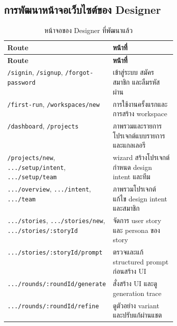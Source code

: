 
\subsection{การพัฒนาหน้าจอเว็บไซต์ของ Designer}
\begingroup
\small
\begin{xltabular}{\linewidth}{|>{\RaggedRight\arraybackslash}p{0.40\linewidth}|>{\RaggedRight\arraybackslash}X|}
  \caption{หน้าจอของ Designer ที่พัฒนาแล้ว}\label{tab:designer-screens}\\
  \hline
  \textbf{Route} & \textbf{หน้าที่} \\ \hline
  \endfirsthead
  \hline
  \textbf{Route} & \textbf{หน้าที่} \\ \hline
  \endhead
  \texttt{/signin}, \texttt{/signup}, \texttt{/forgot-password} & เข้าสู่ระบบ สมัครสมาชิก และลืมรหัสผ่าน \\ \hline
  \texttt{/first-run}, \texttt{/workspaces/new} & การใช้งานครั้งแรกและการสร้าง workspace \\ \hline
  \texttt{/dashboard}, \texttt{/projects} & ภาพรวมและรายการโปรเจกต์แบบรายการและแกลเลอรี \\ \hline
  \texttt{/projects/new}, \texttt{.../setup/intent}, \texttt{.../setup/team} & wizard สร้างโปรเจกต์ กำหนด design intent และทีม \\ \hline
  \texttt{.../overview}, \texttt{.../intent}, \texttt{.../team} & ภาพรวมโปรเจกต์ แก้ไข design intent และสมาชิก \\ \hline
  \texttt{.../stories}, \texttt{.../stories/new}, \texttt{.../stories/:storyId} & จัดการ user story และ persona ของ story \\ \hline
  \texttt{.../stories/:storyId/prompt} & ตรวจและแก้ structured prompt ก่อนสร้าง UI \\ \hline
  \texttt{.../rounds/:roundId/generate} & สั่งสร้าง UI และดู generation trace \\ \hline
  \texttt{.../rounds/:roundId/refine} & ดูตัวอย่าง variant และปรับแก้ผ่านแชต \\ \hline
\end{xltabular}
\endgroup
{}
